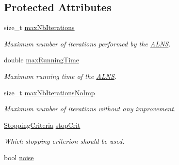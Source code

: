 \subsection*{Protected Attributes}
\begin{DoxyCompactItemize}
\item 
\hypertarget{classALNS__Parameters_ab87f8386bbdca4a6ad80969221241b89}{size\-\_\-t \hyperlink{classALNS__Parameters_ab87f8386bbdca4a6ad80969221241b89}{max\-Nb\-Iterations}}\label{classALNS__Parameters_ab87f8386bbdca4a6ad80969221241b89}

\begin{DoxyCompactList}\small\item\em Maximum number of iterations performed by the \hyperlink{classALNS}{A\-L\-N\-S}. \end{DoxyCompactList}\item 
\hypertarget{classALNS__Parameters_a237afc869df6332419a24db566695024}{double \hyperlink{classALNS__Parameters_a237afc869df6332419a24db566695024}{max\-Running\-Time}}\label{classALNS__Parameters_a237afc869df6332419a24db566695024}

\begin{DoxyCompactList}\small\item\em Maximum running time of the \hyperlink{classALNS}{A\-L\-N\-S}. \end{DoxyCompactList}\item 
\hypertarget{classALNS__Parameters_ae6c8c9933bbb191ab34eeb09830cb283}{size\-\_\-t \hyperlink{classALNS__Parameters_ae6c8c9933bbb191ab34eeb09830cb283}{max\-Nb\-Iterations\-No\-Imp}}\label{classALNS__Parameters_ae6c8c9933bbb191ab34eeb09830cb283}

\begin{DoxyCompactList}\small\item\em Maximum number of iterations without any improvement. \end{DoxyCompactList}\item 
\hypertarget{classALNS__Parameters_a97f844a80a494b76d4d24dbb38c970c5}{\hyperlink{classALNS__Parameters_ae252d050b207dee5b442ca7d02c1d831}{Stopping\-Criteria} \hyperlink{classALNS__Parameters_a97f844a80a494b76d4d24dbb38c970c5}{stop\-Crit}}\label{classALNS__Parameters_a97f844a80a494b76d4d24dbb38c970c5}

\begin{DoxyCompactList}\small\item\em Which stopping criterion should be used. \end{DoxyCompactList}\item 
\hypertarget{classALNS__Parameters_a11b8be72f937debc3751320734db0175}{bool \hyperlink{classALNS__Parameters_a11b8be72f937debc3751320734db0175}{noise}}\label{classALNS__Parameters_a11b8be72f937debc3751320734db0175}


\end{DoxyCompactItemize}
